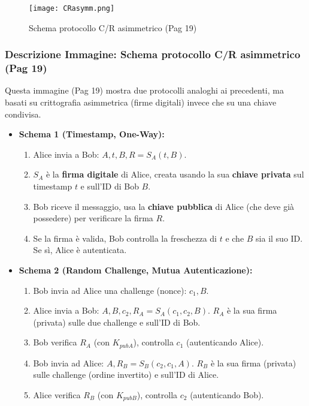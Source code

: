 \documentclass[../main.tex]{subfiles}
\begin{document}
\begin{figure}[H]
  \centering
  \texttt{[image: CRasymm.png]}
  \caption{Schema protocollo C/R asimmetrico (Pag 19)}
  \label{fig:CRasymm}
\end{figure}

\subsubsection*{Descrizione Immagine: Schema protocollo C/R asimmetrico (Pag 19)}
Questa immagine (Pag 19) mostra due protocolli analoghi ai precedenti, ma basati su crittografia asimmetrica (firme digitali) invece che su una chiave condivisa.
\begin{itemize}
    \item \textbf{Schema 1 (Timestamp, One-Way):}
          \begin{enumerate}
              \item Alice invia a Bob: $A, t, B, R = S_A(t, B)$.
              \item $S_A$ è la \textbf{firma digitale} di Alice, creata usando la sua \textbf{chiave privata} sul timestamp $t$ e sull'ID di Bob $B$.
              \item Bob riceve il messaggio, usa la \textbf{chiave pubblica} di Alice (che deve già possedere) per verificare la firma $R$.
              \item Se la firma è valida, Bob controlla la freschezza di $t$ e che $B$ sia il suo ID. Se sì, Alice è autenticata.
          \end{enumerate}
    \item \textbf{Schema 2 (Random Challenge, Mutua Autenticazione):}
          \begin{enumerate}
              \item Bob invia ad Alice una challenge (nonce): $c_1, B$.
              \item Alice invia a Bob: $A, B, c_2, R_A = S_A(c_1, c_2, B)$. $R_A$ è la sua firma (privata) sulle due challenge e sull'ID di Bob.
              \item Bob verifica $R_A$ (con $K_{pubA}$), controlla $c_1$ (autenticando Alice).
              \item Bob invia ad Alice: $A, R_B = S_B(c_2, c_1, A)$. $R_B$ è la sua firma (privata) sulle challenge (ordine invertito) e sull'ID di Alice.
              \item Alice verifica $R_B$ (con $K_{pubB}$), controlla $c_2$ (autenticando Bob).
          \end{enumerate}
\end{itemize}
\end{document}
